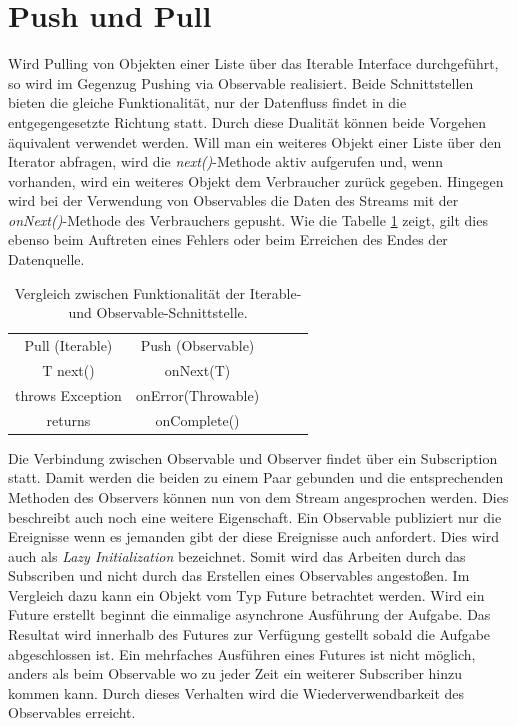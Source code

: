 \section{Push und Pull}
Wird Pulling von Objekten einer Liste über das Iterable Interface durchgeführt, so wird im Gegenzug Pushing via Observable realisiert. Beide Schnittstellen bieten die gleiche Funktionalität, nur der Datenfluss findet in die entgegengesetzte Richtung statt. Durch diese Dualität können beide Vorgehen äquivalent verwendet werden. Will man ein weiteres Objekt einer Liste über den Iterator abfragen, wird die \textit{next()}-Methode aktiv aufgerufen und, wenn vorhanden, wird ein weiteres Objekt dem Verbraucher zurück gegeben. Hingegen wird bei der Verwendung von Observables die Daten des Streams mit der \textit{onNext()}-Methode des Verbrauchers gepusht. Wie die Tabelle \ref{tbl:vglIterObs} zeigt, gilt dies ebenso beim Auftreten eines Fehlers oder beim Erreichen des Endes der Datenquelle.
\begin{table}[]
	\centering
	\begin{tabular}{|c|c|lll}
		\cline{1-2}
		\cellcolor[HTML]{C0C0C0}Pull (Iterable) & \cellcolor[HTML]{C0C0C0}Push (Observable) &  &  &  \\ \cline{1-2}
		T next()                                & onNext(T)                                 &  &  &  \\ \cline{1-2}
		throws Exception                        & onError(Throwable)                        &  &  &  \\ \cline{1-2}
		returns                                 & onComplete()                             &  &  &  \\ \cline{1-2}
	\end{tabular}
	\caption{Vergleich zwischen Funktionalität der Iterable- und Observable-Schnittstelle.}
	\label{tbl:vglIterObs}
\end{table}
Die Verbindung zwischen Observable und Observer findet über ein Subscription statt. Damit werden die beiden zu einem Paar gebunden und die entsprechenden Methoden des Observers können nun von dem Stream angesprochen werden. Dies beschreibt auch noch eine weitere Eigenschaft. Ein Observable publiziert nur die Ereignisse wenn es jemanden gibt der diese Ereignisse auch anfordert. Dies wird auch als \textit{Lazy Initialization} bezeichnet. Somit wird das Arbeiten durch das Subscriben und nicht durch das Erstellen eines Observables angestoßen. Im Vergleich dazu kann ein Objekt vom Typ Future betrachtet werden. Wird ein Future erstellt beginnt die einmalige asynchrone Ausführung der Aufgabe. Das Resultat wird innerhalb des Futures zur Verfügung gestellt sobald die Aufgabe abgeschlossen ist. Ein mehrfaches Ausführen eines Futures ist nicht möglich, anders als beim Observable wo zu jeder Zeit ein weiterer Subscriber hinzu kommen kann. Durch dieses Verhalten wird die Wiederverwendbarkeit des Observables erreicht. 
